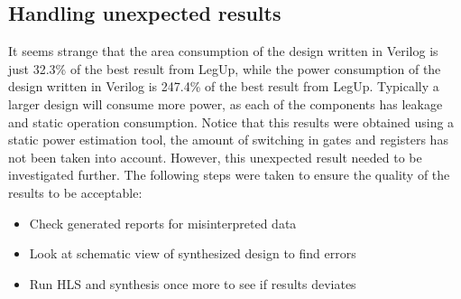\subsection{Handling unexpected results}
It seems strange that the area consumption of the design written in Verilog is just 32.3\% of the best result from LegUp, while the power consumption of the design written in Verilog is 247.4\% of the best result from LegUp. Typically a larger design will consume more power, as each of the components has leakage and static operation consumption. Notice that this results were obtained using a static power estimation tool, the amount of switching in gates and registers has not been taken into account. However, this unexpected result needed to be investigated further. The following steps were taken to ensure the quality of the results to be acceptable:

\begin{itemize}
    \item Check generated reports for misinterpreted data
    \item Look at schematic view of synthesized design to find errors
    \item Run HLS and synthesis once more to see if results deviates
\end{itemize}

